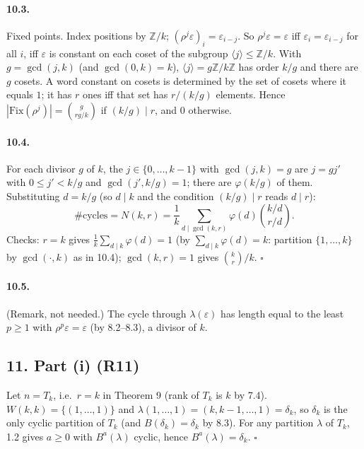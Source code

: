 \documentclass[11pt]{article}
\begin{document}
\paragraph{10.3.} Fixed points. Index positions by $\mathbb Z/k$; $(\rho^j\varepsilon)_i=\varepsilon_{i-j}$. So
$\rho^j\varepsilon=\varepsilon$ iff $\varepsilon_i=\varepsilon_{i-j}$ for all $i$, iff $\varepsilon$ is constant on each
coset of the subgroup $\langle j\rangle\le\mathbb Z/k$. With $g=\gcd(j,k)$ (and $\gcd(0,k)=k$),
$\langle j\rangle=g\mathbb Z/k\mathbb Z$ has order $k/g$ and there are $g$ cosets. A word constant on cosets is
determined by the set of cosets where it equals $1$; it has $r$ ones iff that set has $r/(k/g)$ elements. Hence
$|\mathrm{Fix}(\rho^j)|=\binom{g}{rg/k}$ if $(k/g)\mid r$, and $0$ otherwise.

\paragraph{10.4.} For each divisor $g$ of $k$, the $j\in\{0,\ldots,k-1\}$ with $\gcd(j,k)=g$ are $j=gj'$ with
$0\le j'<k/g$ and $\gcd(j',k/g)=1$; there are $\varphi(k/g)$ of them. Substituting $d=k/g$ (so $d\mid k$ and the
condition $(k/g)\mid r$ reads $d\mid r$):
\[
\#\text{cycles}=N(k,r)=\frac1k\sum_{d\mid\gcd(k,r)}\varphi(d)\binom{k/d}{r/d}.
\]
Checks: $r=k$ gives $\frac1k\sum_{d\mid k}\varphi(d)=1$ (by $\sum_{d\mid k}\varphi(d)=k$: partition
$\{1,\ldots,k\}$ by $\gcd(\cdot,k)$ as in 10.4); $\gcd(k,r)=1$ gives $\binom kr/k$. $\square$

\paragraph{10.5.} (Remark, not needed.) The cycle through $\lambda(\varepsilon)$ has length equal to the least
$p\ge1$ with $\rho^p\varepsilon=\varepsilon$ (by 8.2--8.3), a divisor of $k$.

\subsection*{11. Part (i) (R11)}

Let $n=T_k$, i.e.\ $r=k$ in Theorem 9 (rank of $T_k$ is $k$ by 7.4). $W(k,k)=\{(1,\ldots,1)\}$ and
$\lambda(1,\ldots,1)=(k,k-1,\ldots,1)=\delta_k$, so $\delta_k$ is the only cyclic partition of $T_k$ (and
$B(\delta_k)=\delta_k$ by 8.3). For any partition $\lambda$ of $T_k$, 1.2 gives $a\ge0$ with $B^a(\lambda)$
cyclic, hence $B^a(\lambda)=\delta_k$. $\square$
\end{document}
